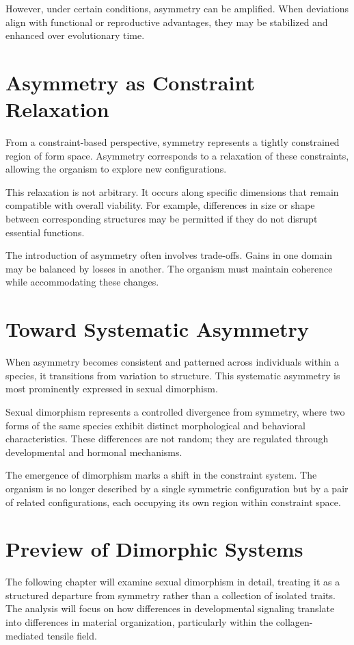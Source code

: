 \documentclass[11pt,oneside]{book}
\begin{document}
However, under certain conditions, asymmetry can be amplified. When deviations align with functional or reproductive advantages, they may be stabilized and enhanced over evolutionary time.

\section{Asymmetry as Constraint Relaxation}

From a constraint-based perspective, symmetry represents a tightly constrained region of form space. Asymmetry corresponds to a relaxation of these constraints, allowing the organism to explore new configurations.

This relaxation is not arbitrary. It occurs along specific dimensions that remain compatible with overall viability. For example, differences in size or shape between corresponding structures may be permitted if they do not disrupt essential functions.

The introduction of asymmetry often involves trade-offs. Gains in one domain may be balanced by losses in another. The organism must maintain coherence while accommodating these changes.

\section{Toward Systematic Asymmetry}

When asymmetry becomes consistent and patterned across individuals within a species, it transitions from variation to structure. This systematic asymmetry is most prominently expressed in sexual dimorphism.

Sexual dimorphism represents a controlled divergence from symmetry, where two forms of the same species exhibit distinct morphological and behavioral characteristics. These differences are not random; they are regulated through developmental and hormonal mechanisms.

The emergence of dimorphism marks a shift in the constraint system. The organism is no longer described by a single symmetric configuration but by a pair of related configurations, each occupying its own region within constraint space.

\section{Preview of Dimorphic Systems}

The following chapter will examine sexual dimorphism in detail, treating it as a structured departure from symmetry rather than a collection of isolated traits. The analysis will focus on how differences in developmental signaling translate into differences in material organization, particularly within the collagen-mediated tensile field.
\end{document}

